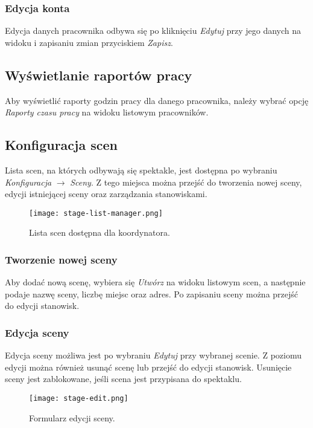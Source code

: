 \documentclass[shortabstract]{iithesis}
\begin{document}
\subsubsection{Edycja konta}

Edycja danych pracownika odbywa się po kliknięciu \textit{Edytuj} przy jego danych na widoku  i zapisaniu zmian przyciskiem \textit{Zapisz}.

\subsection{Wyświetlanie raportów pracy}

Aby wyświetlić raporty godzin pracy dla danego pracownika, należy wybrać opcję \textit{Raporty czasu pracy} na widoku listowym pracowników.

\subsection{Konfiguracja scen}
\label{stage-edit}

Lista scen, na których odbywają się spektakle, jest dostępna po wybraniu \textit{Konfiguracja} $\rightarrow$ \textit{Sceny}. Z tego miejsca można przejść do tworzenia nowej sceny, edycji istniejącej sceny oraz zarządzania stanowiskami.

\begin{figure}[h]
    \centering
    \texttt{[image: stage-list-manager.png]}
    \caption{Lista scen dostępna dla koordynatora.}
    \label{fig:stage-list-manager}
\end{figure}

\subsubsection{Tworzenie nowej sceny}
Aby dodać nową scenę, wybiera się \textit{Utwórz} na widoku listowym scen, a następnie podaje nazwę sceny, liczbę miejsc oraz adres. Po zapisaniu sceny można przejść do edycji stanowisk.

\subsubsection{Edycja sceny}
Edycja sceny możliwa jest po wybraniu \textit{Edytuj} przy wybranej scenie. Z poziomu edycji można również usunąć scenę lub przejść do edycji stanowisk. Usunięcie sceny jest zablokowane, jeśli scena jest przypisana do spektaklu.

\begin{figure}[h]
    \centering
    \texttt{[image: stage-edit.png]}
    \caption{Formularz edycji sceny.}
    \label{fig:stage-edit}
\end{figure}
\end{document}
